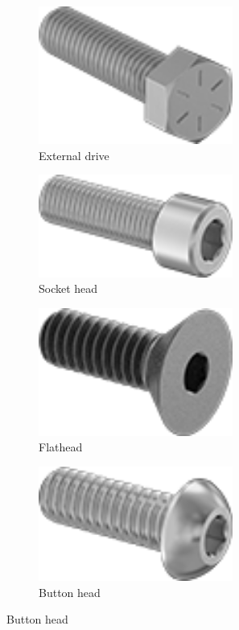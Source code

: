 \documentclass[10pt,letterpaper]{book}
\begin{document}
	\begin{figure}[H]
		\centering
		\begin{subfigure}[b]{.24\linewidth}
			\includegraphics[width=0.7\textwidth]{imgs/hhcs.png}
			\caption{External drive}
		\end{subfigure}\begin{subfigure}[b]{.24\linewidth}
			\includegraphics[width=0.7\textwidth]{imgs/shcs.png}
			\caption{Socket head}
		\end{subfigure}\begin{subfigure}[b]{.24\linewidth}
			\includegraphics[width=0.7\textwidth]{imgs/fhcs.png}
			\caption{Flathead}
		\end{subfigure}\begin{subfigure}[b]{.24\linewidth}
			\includegraphics[width=0.7\textwidth]{imgs/bhcs.png}
			\caption{Button head}
		\end{subfigure}
		

\end{figure}
\end{document}
